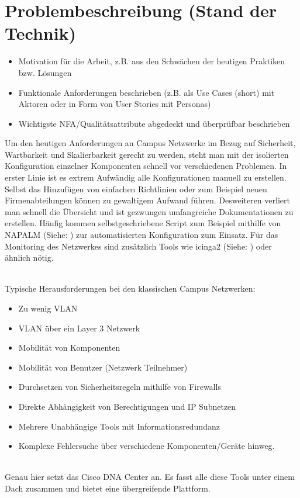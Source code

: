 \section{Problembeschreibung (Stand der Technik)}

\begin{itemize}	
	\item Motivation für die Arbeit, z.B. aus den Schwächen der heutigen Praktiken bzw. Lösungen
	\item Funktionale Anforderungen beschrieben (z.B. als Use Cases (short) mit Aktoren oder in Form von User Stories mit Personas)
	\item Wichtigste NFA/Qualitätsattribute abgedeckt und überprüfbar beschrieben
\end{itemize}

Um den heutigen Anforderungen an Campus Netzwerke im Bezug auf Sicherheit, Wartbarkeit und Skalierbarkeit gerecht zu werden, steht man mit der isolierten Konfiguration einzelner Komponenten schnell vor verschiedenen Problemen. In erster Linie ist es extrem Aufwändig alle Konfigurationen manuell zu erstellen. Selbst das Hinzufügen von einfachen Richtlinien oder zum Beispiel neuen Firmenabteilungen können zu gewaltigem Aufwand führen. Desweiteren verliert man schnell die Übersicht und ist gezwungen umfangreiche Dokumentationen zu erstellen. Häufig kommen selbstgeschriebene Script zum Beispiel mithilfe von NAPALM (Siehe: \cite{napalm}) zur automatisierten Konfiguration zum Einsatz. Für das Monitoring des Netzwerkes sind zusätzlich Tools wie icinga2  (Siehe: \cite{icinga2}) oder ähnlich nötig. 

~\\
Typische Herausforderungen bei den klassischen Campus Netzwerken:
\begin{itemize}
	\item Zu wenig VLAN
	\item VLAN über ein Layer 3 Netzwerk
	\item Mobilität von Komponenten
	\item Mobilität von Benutzer (Netzwerk Teilnehmer)
	\item Durchsetzen von Sicherheitsregeln mithilfe von Firewalls
	\item Direkte Abhängigkeit von Berechtigungen und IP Subnetzen
	\item Mehrere Unabhängige Tools mit Informationsredundanz
	\item Komplexe Fehlersuche über verschiedene Komponenten/Geräte hinweg.
\end{itemize}

~\\
Genau hier setzt das Cisco DNA Center an. Es fasst alle diese Tools unter einem Dach zusammen und bietet eine übergreifende Plattform. 

